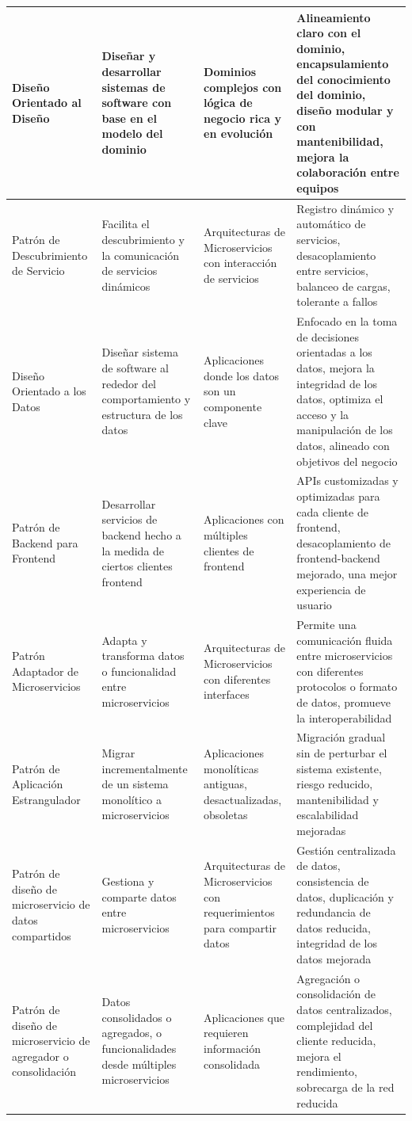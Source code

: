 \documentclass[stu,12pt,floatsintext]{apa7}
\begin{document}
\begin{longtable}{ | >{\centering\arraybackslash}p{3cm} | >{\centering\arraybackslash}p{3cm} | >{\centering\arraybackslash}p{3cm} | >{\centering\arraybackslash}p{3cm} | }
		Diseño Orientado al Diseño & Diseñar y desarrollar sistemas de software con base en el modelo del dominio & Dominios complejos con lógica de negocio rica y en evolución & Alineamiento claro con el dominio, encapsulamiento del conocimiento del dominio, diseño modular y con mantenibilidad, mejora la colaboración entre equipos \\
		\hline
		Patrón de Descubrimiento de Servicio & Facilita el descubrimiento y la comunicación de servicios dinámicos & Arquitecturas de Microservicios con interacción de servicios & Registro dinámico y automático de servicios, desacoplamiento entre servicios, balanceo de cargas, tolerante a fallos\\
		\hline
		Diseño Orientado a los Datos&Diseñar sistema de software al rededor del comportamiento y estructura de los datos & Aplicaciones donde los datos son un componente clave& Enfocado en la toma de decisiones orientadas a los datos, mejora la integridad de los datos, optimiza el acceso y la manipulación de los datos, alineado con objetivos del negocio \\
		\hline
		Patrón de Backend para Frontend& Desarrollar servicios de backend hecho a la medida de ciertos clientes frontend&Aplicaciones con múltiples clientes de frontend& APIs customizadas y optimizadas para cada cliente de frontend, desacoplamiento de frontend-backend mejorado, una mejor experiencia de usuario \\
		\hline
		Patrón Adaptador de Microservicios&Adapta y transforma datos o funcionalidad entre microservicios&Arquitecturas de Microservicios con diferentes interfaces&Permite una comunicación fluida entre microservicios con diferentes protocolos o formato de datos, promueve la interoperabilidad\\
		\hline
		Patrón de Aplicación Estrangulador&Migrar incrementalmente de un sistema monolítico a microservicios & Aplicaciones monolíticas antiguas, desactualizadas, obsoletas & Migración gradual sin de perturbar el sistema existente, riesgo reducido, mantenibilidad y escalabilidad mejoradas\\
		\hline
		Patrón de diseño de microservicio de datos compartidos&Gestiona y comparte datos entre microservicios &Arquitecturas de Microservicios con requerimientos para compartir datos&Gestión centralizada de datos, consistencia de datos, duplicación y redundancia de datos reducida, integridad de los datos mejorada\\
		\hline
		Patrón de diseño de microservicio de agregador o consolidación&Datos consolidados o agregados, o funcionalidades desde múltiples microservicios&Aplicaciones que requieren información consolidada& Agregación o consolidación de datos centralizados, complejidad del cliente reducida, mejora el rendimiento, sobrecarga de la red reducida\\
		\hline
		
	\end{longtable}
\end{document}

